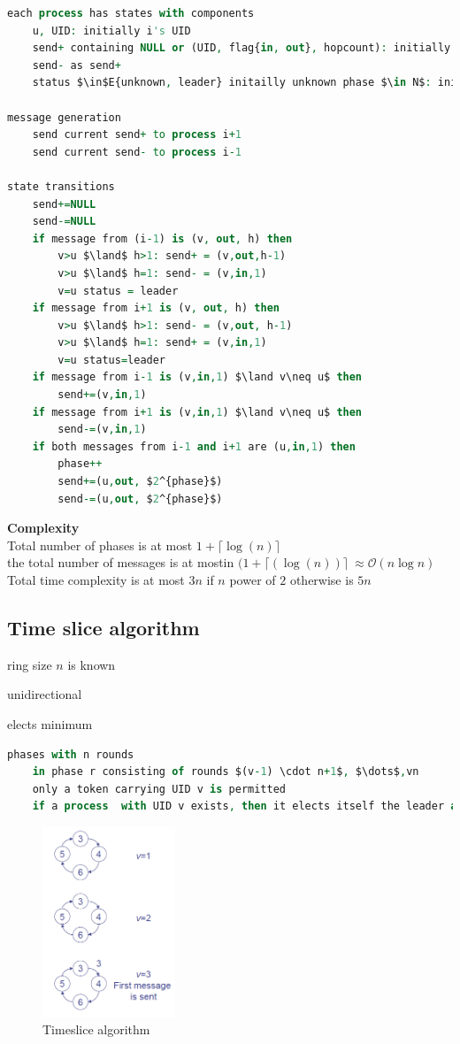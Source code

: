 \begin{lstlisting}[mathescape, language=VHDL]
each process has states with components
	u, UID: initially i's UID
	send+ containing NULL or (UID, flag{in, out}, hopcount): initially (i's UID, out, 1)
	send- as send+
	status $\in$E{unknown, leader} initailly unknown phase $\in N$: initially 0

message generation
	send current send+ to process i+1
	send current send- to process i-1

state transitions
	send+=NULL
	send-=NULL
	if message from (i-1) is (v, out, h) then
		v>u $\land$ h>1: send+ = (v,out,h-1)
		v>u $\land$ h=1: send- = (v,in,1)
		v=u status = leader
	if message from i+1 is (v, out, h) then
		v>u $\land$ h>1: send- = (v,out, h-1)
		v>u $\land$ h=1: send+ = (v,in,1)
		v=u status=leader
	if message from i-1 is (v,in,1) $\land v\neq u$ then
		send+=(v,in,1)
	if message from i+1 is (v,in,1) $\land v\neq u$ then
		send-=(v,in,1)
	if both messages from i-1 and i+1 are (u,in,1) then
		phase++
		send+=(u,out, $2^{phase}$)
		send-=(u,out, $2^{phase}$)
\end{lstlisting}
\textbf{Complexity}\\
Total number of phases is at most $1+\lceil\log(n)\rceil$\\
the total number of messages is at mostin $(1+\lceil(\log(n))\rceil\ \approx \mathcal{O}(n\log n)$\\
Total time complexity is at most $3n$ if $n$ power of $2$ otherwise is $5n$\\

\subsection{Time slice algorithm}
\begin{compactitem}
\item ring size $n$ is known
\item unidirectional
\item elects minimum
\end{compactitem}


\begin{lstlisting}[mathescape, language=VHDL]
	phases with n rounds
	in phase r consisting of rounds $(v-1) \cdot n+1$, $\dots$,vn
	only a token carrying UID v is permitted
	if a process  with UID v exists, then it elects itself the leader and sends a token with it's UID
\end{lstlisting}

\begin{figure}[h]
	\centering
	\includegraphics[width=150px]{gfx/timeslice.png}
	\caption{Timeslice algorithm}
	\label{img:timeslice}
\end{figure}

